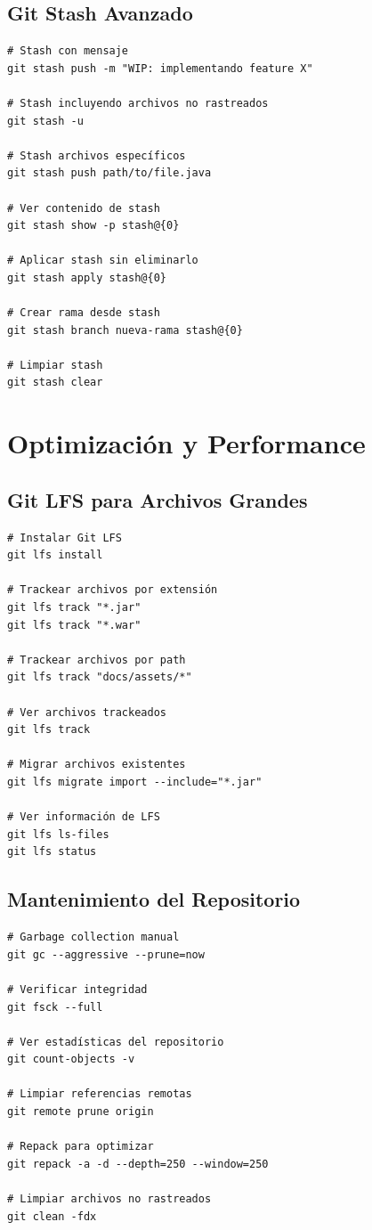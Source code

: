 \documentclass[12pt,a4paper]{article}
\begin{document}
\subsection{Git Stash Avanzado}
\begin{lstlisting}[caption=Gestión avanzada de stash]
# Stash con mensaje
git stash push -m "WIP: implementando feature X"

# Stash incluyendo archivos no rastreados
git stash -u

# Stash archivos específicos
git stash push path/to/file.java

# Ver contenido de stash
git stash show -p stash@{0}

# Aplicar stash sin eliminarlo
git stash apply stash@{0}

# Crear rama desde stash
git stash branch nueva-rama stash@{0}

# Limpiar stash
git stash clear
\end{lstlisting}

\section{Optimización y Performance}

\subsection{Git LFS para Archivos Grandes}
\begin{lstlisting}[caption=Gestión de archivos grandes]
# Instalar Git LFS
git lfs install

# Trackear archivos por extensión
git lfs track "*.jar"
git lfs track "*.war"

# Trackear archivos por path
git lfs track "docs/assets/*"

# Ver archivos trackeados
git lfs track

# Migrar archivos existentes
git lfs migrate import --include="*.jar"

# Ver información de LFS
git lfs ls-files
git lfs status
\end{lstlisting}

\subsection{Mantenimiento del Repositorio}
\begin{lstlisting}[caption=Optimización y limpieza]
# Garbage collection manual
git gc --aggressive --prune=now

# Verificar integridad
git fsck --full

# Ver estadísticas del repositorio
git count-objects -v

# Limpiar referencias remotas
git remote prune origin

# Repack para optimizar
git repack -a -d --depth=250 --window=250

# Limpiar archivos no rastreados
git clean -fdx
\end{lstlisting}
\end{document}
